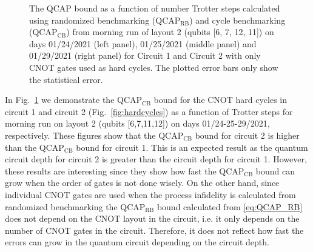 \begin{figure}[ht!]
    \caption{The QCAP bound as a function of number Trotter steps calculated using randomized benchmarking (QCAP$_{\text{RB}}$) and cycle  benchmarking (QCAP$_{\text{CB}}$) from morning run of layout 2 (qubits [6, 7, 12, 11]) on days 01/24/2021 (left panel), 01/25/2021 (middle panel) and 01/29/2021 (right panel) for Circuit 1 and Circuit 2 with only CNOT gates used as hard cycles. The  plotted  error  bars  only show the statistical error.}
    \label{fig:QCAP_circ1_circ2_24th_25th_29th_L2_Morning}
\end{figure}
In Fig.~\ref{fig:QCAP_circ1_circ2_24th_25th_29th_L2_Morning} we demonstrate the QCAP$_{\text{CB}}$ bound for the CNOT hard cycles in circuit 1 and circuit 2 (Fig.~\ref{fig:hardcycles}) as a function of Trotter steps for morning run on layout 2 (qubits [6,7,11,12]) on days 01/24-25-29/2021, respectively. These figures show that the QCAP$_{\text{CB}}$ bound for circuit 2 is higher than the QCAP$_{\text{CB}}$ bound for circuit 1. This is an expected result as the quantum circuit depth for circuit 2 is greater than the circuit depth for circuit 1. However, these results are interesting since they show how fast the QCAP$_{\text{CB}}$ bound can grow when the order of gates is not done wisely. On the other hand, since individual CNOT gates are used when the process infidelity is calculated from randomized benchmarking the QCAP$_{\text{RB}}$ bound calculated from \eqref{eq:QCAP_RB} does not depend on the CNOT layout in the circuit, i.e. it only depends on the number of CNOT gates in the circuit. Therefore, it does not reflect how fast the errors can grow in the quantum circuit depending on the circuit depth.